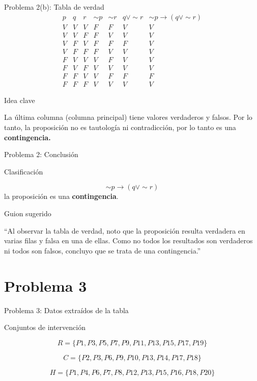 \documentclass[aspectratio=169,11pt]{beamer}
\newcommand{\BloqueVisual}[2]{
	\begin{block}{#1}
		#2
	\end{block}
}
\newcommand{\BloqueGuion}[1]{
	\begin{exampleblock}{Guion sugerido}
		#1
	\end{exampleblock}
}
\newcommand{\BloqueClave}[1]{
	\begin{alertblock}{Idea clave}
		#1
	\end{alertblock}
}
\begin{document}
	\begin{frame}{Problema 2(b): Tabla de verdad}
		\small
		\[
		\begin{array}{c|c|c|c|c|c|c}
			p & q & r & \sim p & \sim r& q\lor \sim r & \sim p \to (q\lor \sim r)\\
			\hline
			V & V & V & F & F & V & V\\
			V & V & F & F & V & V & V\\
			V & F & V & F & F & F & V\\
			V & F & F & F & V & V & V\\
			F & V & V & V & F & V & V\\
			F & V & F & V & V & V & V\\
			F & F & V & V & F & F & F\\
			F & F & F & V & V & V & V
		\end{array}
		\]
		\normalsize
		
		\BloqueClave{
			La última columna (columna principal) tiene valores verdaderos y falsos. Por lo tanto, la proposición no es tautología ni contradicción, por lo tanto es una \textbf{contingencia.}
		}
	\end{frame}
	
	\begin{frame}{Problema 2: Conclusión}
		\BloqueVisual{Clasificación}{
			\[
			\sim p \to (q\lor \sim r)
			\]
			la proposición es una \textbf{contingencia}.
		}
		
		\BloqueGuion{
			``Al observar la tabla de verdad, noto que la proposición resulta verdadera en varias filas y falsa en una de ellas. Como no todos los resultados son verdaderos ni todos son falsos, concluyo que se trata de una contingencia.''}
	\end{frame}
	
	\section{Problema 3}
	
	\begin{frame}{Problema 3: Datos extraídos de la tabla}
		\BloqueVisual{Conjuntos de intervención}{
			\[
			R=\{P1,P3,P5,P7,P9,P11,P13,P15,P17,P19\}
			\]
			
			\[
			C=\{P2,P3,P6,P9,P10,P13,P14,P17,P18\}
			\]
			
			\[
			H=\{P1,P4,P6,P7,P8,P12,P13,P15,P16,P18,P20\}
			\]
		}
	\end{frame}
	
\end{document}
